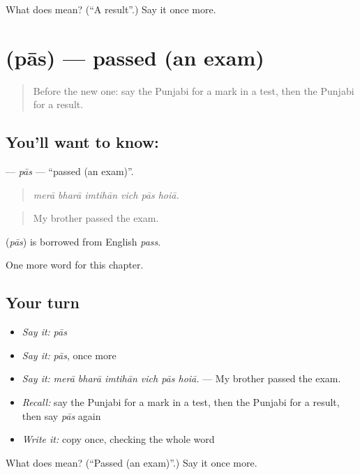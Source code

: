 \begin{tcolorbox}[breakable,colback=teal!4,colframe=teal!35!black,title={Before you move on}]
What does  mean? (\textquotedblleft{}A result\textquotedblright{}.) Say it once more.
\end{tcolorbox}
\section[\texorpdfstring{\pa{ਪਾਸ} (pās)}{ਪਾਸ (pās)}]{ (pās) — passed (an exam)}

\label{lesson:PA-C360-pas}



\begin{quote}
Before the new one: say the Punjabi for a mark in a test, then the Punjabi for a result.
\end{quote}

\subsection*{You'll want to know: }
\textbf{} — \emph{pās} — \textquotedblleft{}passed (an exam)\textquotedblright{}.

\begin{quote}
     
\end{quote}

\begin{quote}
\emph{merā bharā imtihān vich pās hoiā.}
\end{quote}

\begin{quote}
My brother passed the exam.
\end{quote}

\begin{cousinweb}
\textbf{} (\emph{pās}) is borrowed from English \emph{pass}.
\end{cousinweb}

\begin{grammarlens}[title={What you've built}]
One more word for this chapter.
\end{grammarlens}

\subsection*{Your turn}
\begin{itemize}
\raggedright
  \item \emph{Say it:} \emph{pās}
  \item \emph{Say it:} \emph{pās}, once more
  \item \emph{Say it:} \emph{merā bharā imtihān vich pās hoiā.} — My brother passed the exam.
  \item \emph{Recall:} say the Punjabi for a mark in a test, then the Punjabi for a result, then say \emph{pās} again
  \item \emph{Write it:} copy \textbf{} once, checking the whole word
\end{itemize}

\begin{tcolorbox}[breakable,colback=teal!4,colframe=teal!35!black,title={Before you move on}]
What does  mean? (\textquotedblleft{}Passed (an exam)\textquotedblright{}.) Say it once more.
\end{tcolorbox}
